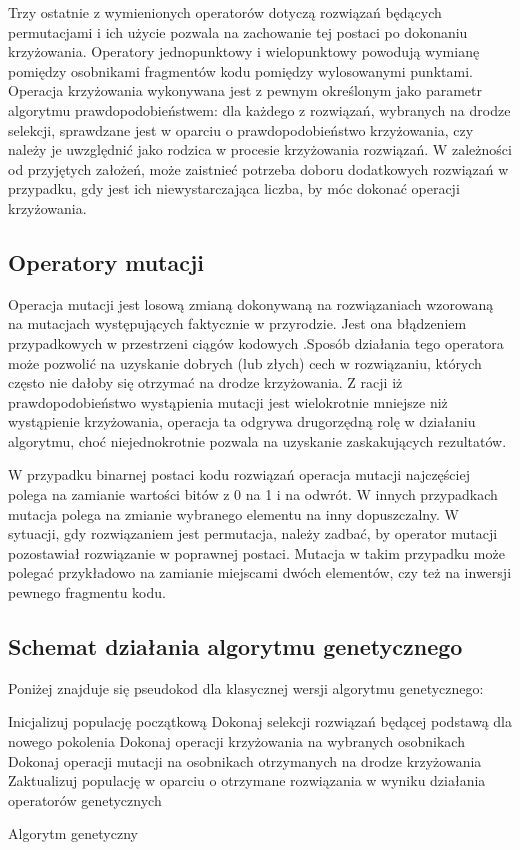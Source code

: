 Trzy ostatnie z wymienionych operatorów dotyczą rozwiązań będących permutacjami i ich użycie pozwala na zachowanie tej postaci po dokonaniu krzyżowania. Operatory jednopunktowy i wielopunktowy powodują wymianę pomiędzy osobnikami fragmentów kodu pomiędzy wylosowanymi punktami. Operacja krzyżowania wykonywana jest z pewnym określonym jako parametr algorytmu prawdopodobieństwem: dla każdego z rozwiązań, wybranych na drodze selekcji, sprawdzane jest w oparciu o prawdopodobieństwo krzyżowania, czy należy je uwzględnić jako rodzica w procesie krzyżowania rozwiązań. W zależności od przyjętych założeń, może zaistnieć potrzeba doboru dodatkowych rozwiązań w przypadku, gdy jest ich niewystarczająca liczba, by móc dokonać operacji krzyżowania.

\subsection{Operatory mutacji}
Operacja mutacji jest losową zmianą dokonywaną na rozwiązaniach wzorowaną na mutacjach występujących faktycznie w przyrodzie. Jest ona błądzeniem przypadkowych w przestrzeni ciągów kodowych \cite{GOLDBERG}.Sposób działania tego operatora może pozwolić na uzyskanie dobrych (lub złych) cech w rozwiązaniu, których często nie dałoby się otrzymać na drodze krzyżowania. Z racji iż prawdopodobieństwo wystąpienia mutacji jest wielokrotnie mniejsze niż wystąpienie krzyżowania, operacja ta odgrywa drugorzędną rolę w działaniu algorytmu, choć niejednokrotnie pozwala na uzyskanie zaskakujących rezultatów.

W przypadku binarnej postaci kodu rozwiązań operacja mutacji najczęściej polega na zamianie wartości bitów z 0 na 1 i na odwrót. W innych przypadkach mutacja polega na zmianie wybranego elementu na inny dopuszczalny. W sytuacji, gdy rozwiązaniem jest permutacja, należy zadbać, by operator mutacji pozostawiał rozwiązanie w poprawnej postaci. Mutacja w takim przypadku może polegać przykładowo na zamianie miejscami dwóch elementów, czy też na inwersji pewnego fragmentu kodu. 

\subsection{Schemat działania algorytmu genetycznego}
Poniżej znajduje się pseudokod dla klasycznej wersji algorytmu genetycznego:
\begin{algorithm}[H]
	Inicjalizuj populację początkową\;
 	{
 		Dokonaj selekcji rozwiązań będącej podstawą dla nowego pokolenia\;
 		Dokonaj operacji krzyżowania na wybranych osobnikach\;
 		Dokonaj operacji mutacji na osobnikach otrzymanych na drodze krzyżowania\;
 		Zaktualizuj populację w oparciu o otrzymane rozwiązania w wyniku działania operatorów genetycznych
 	}
 	\caption{Algorytm genetyczny}
\end{algorithm}
